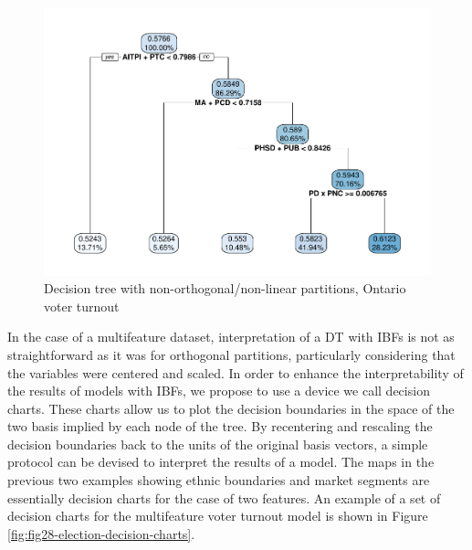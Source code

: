 \documentclass[]{elsarticle} %
\makeatletter
\def\maxwidth{\ifdim\Gin@nat@width>\linewidth\linewidth
\else\Gin@nat@width\fi}
\let\Oldincludegraphics\includegraphics
\renewcommand{\includegraphics}[1]{\Oldincludegraphics[width=\maxwidth]{#1}}
\makeatother
\begin{document}
\begin{figure}
\centering
\includegraphics{Trees_with_Base_Functions_v3_files/figure-latex/fig27-tree-basis-election-1.pdf}
\caption{\label{fig:fig27-tree-basis-election}Decision tree with
non-orthogonal/non-linear partitions, Ontario voter turnout}
\end{figure}

In the case of a multifeature dataset, interpretation of a DT with IBFs
is not as straightforward as it was for orthogonal partitions,
particularly considering that the variables were centered and scaled. In
order to enhance the interpretability of the results of models with
IBFs, we propose to use a device we call decision charts. These charts
allow us to plot the decision boundaries in the space of the two basis
implied by each node of the tree. By recentering and rescaling the
decision boundaries back to the units of the original basis vectors, a
simple protocol can be devised to interpret the results of a model. The
maps in the previous two examples showing ethnic boundaries and market
segments are essentially decision charts for the case of two features.
An example of a set of decision charts for the multifeature voter
turnout model is shown in Figure
\ref{fig:fig28-election-decision-charts}.
\end{document}
